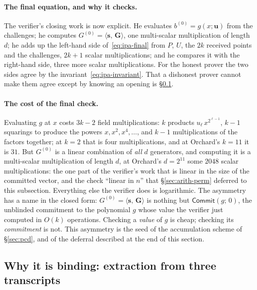 \documentclass[11pt,a4paper]{article}
\theoremstyle{definition}
\newcommand{\ip}[2]{\langle #1,\, #2 \rangle}
\newcommand{\Comm}{\mathsf{Commit}}
\begin{document}
\paragraph{The final equation, and why it checks.}
The verifier's closing work is now explicit. He evaluates
$b^{(0)} = g(x; \mathbf u)$ from the challenges; he computes
$G^{(0)} = \ip{\mathbf s}{\mathbf G}$, one multi-scalar multiplication
of length $d$; he adds up the left-hand side of~\eqref{eq:ipa-final}
from $P$, $U$, the $2k$ received points and the challenges, $2k + 1$
scalar multiplications; and he compares it with the right-hand side,
three more scalar multiplications. For the honest prover the two sides
agree by the invariant~\eqref{eq:ipa-invariant}. That a dishonest prover
cannot make them agree except by knowing an opening is
\S\ref{sec:ipa-binding}.

\paragraph{The cost of the final check.}
Evaluating $g$ at $x$ costs $3k - 2$ field multiplications: $k$
products $u_\ell\,x^{2^{\ell-1}}$, $k - 1$ squarings to produce the
powers $x, x^2, x^4, \dots$, and $k - 1$ multiplications of the factors
together; at $k = 2$ that is four multiplications, and at Orchard's
$k = 11$ it is $31$. But $G^{(0)}$ is a linear combination of \emph{all}
$d$ generators, and computing it is a multi-scalar multiplication of
length $d$, at Orchard's $d = 2^{11}$ some $2048$ scalar
multiplications: the one part of the verifier's work that is linear in
the size of the committed vector, and the check ``linear in $n$'' that
\S\ref{sec:arith-perm} deferred to this subsection. Everything else the
verifier does is logarithmic. The asymmetry has a name in the closed
form: $G^{(0)} = \ip{\mathbf s}{\mathbf G}$ is nothing but
$\Comm(g;\, 0)$, the unblinded commitment to the polynomial $g$ whose
value the verifier just computed in $O(k)$ operations. Checking a
\emph{value} of $g$ is cheap; checking its \emph{commitment} is not.
This asymmetry is the seed of the accumulation scheme of
\S\ref{sec:pcd}, and of the deferral described at the end of this
section.

\subsection{Why it is binding: extraction from three transcripts}
\label{sec:ipa-binding}
\end{document}
